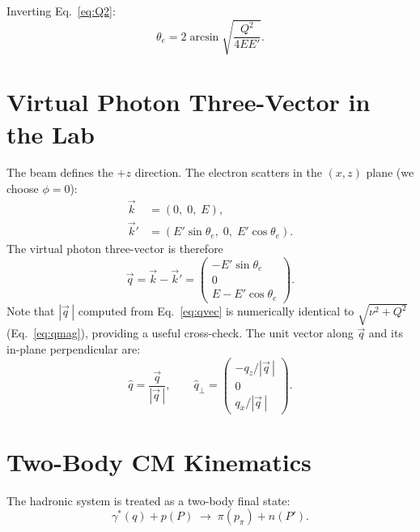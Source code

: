 \documentclass[12pt,a4paper]{article}
\begin{document}
Inverting Eq.~\eqref{eq:Q2}:
\begin{equation}
  \theta_e = 2\arcsin\!\sqrt{\frac{Q^2}{4 E E'}}.
  \label{eq:thetae}
\end{equation}

\section{Virtual Photon Three-Vector in the Lab}

The beam defines the $+z$ direction. The electron scatters in the $(x,z)$
plane (we choose $\phi = 0$):
\begin{align}
  \vec{k}  &= (0,\; 0,\; E),\\
  \vec{k}' &= (E' \sin\theta_e,\; 0,\; E' \cos\theta_e).
\end{align}
The virtual photon three-vector is therefore
\begin{equation}
  \vec{q} = \vec{k} - \vec{k}' =
  \begin{pmatrix} -E' \sin\theta_e \\ 0 \\ E - E' \cos\theta_e \end{pmatrix}.
  \label{eq:qvec}
\end{equation}
Note that $|\vec{q}\,|$ computed from Eq.~\eqref{eq:qvec} is numerically
identical to $\sqrt{\nu^2 + Q^2}$ (Eq.~\eqref{eq:qmag}), providing a useful
cross-check. The unit vector along $\vec{q}$ and its in-plane perpendicular
are:
\begin{equation}
  \hat{q} = \frac{\vec{q}}{|\vec{q}\,|},
  \qquad
  \hat{q}_\perp = \begin{pmatrix} -q_z/|\vec{q}\,| \\ 0 \\ q_x/|\vec{q}\,| \end{pmatrix}.
  \label{eq:qhat}
\end{equation}

\section{Two-Body CM Kinematics}

The hadronic system is treated as a two-body final state:
\begin{equation}
  \gamma^*(q) + p(P) \;\longrightarrow\; \pi(p_\pi) + n(P').
\end{equation}
\end{document}
